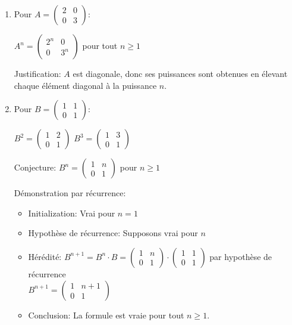 \documentclass[10pt,a4paper]{article}
\begin{document}
\begin{enumerate}
    \item Pour $A = \begin{pmatrix} 2 & 0 \\ 0 & 3 \end{pmatrix}$:

    $A^n = \begin{pmatrix} 2^n & 0 \\ 0 & 3^n \end{pmatrix}$ pour tout $n \geq 1$

    Justification: $A$ est diagonale, donc ses puissances sont obtenues en élevant chaque élément diagonal à la puissance $n$.

    \item Pour $B = \begin{pmatrix} 1 & 1 \\ 0 & 1 \end{pmatrix}$:

    $B^2 = \begin{pmatrix} 1 & 2 \\ 0 & 1 \end{pmatrix}$
    $B^3 = \begin{pmatrix} 1 & 3 \\ 0 & 1 \end{pmatrix}$

    Conjecture: $B^n = \begin{pmatrix} 1 & n \\ 0 & 1 \end{pmatrix}$ pour $n \geq 1$

    Démonstration par récurrence:
    \begin{itemize}
        \item Initialization: Vrai pour $n=1$
        \item Hypothèse de récurrence: Supposons vrai pour $n$
        \item Hérédité: $B^{n+1} = B^n \cdot B = \begin{pmatrix} 1 & n \\ 0 & 1 \end{pmatrix} \cdot
        \begin{pmatrix} 1 & 1 \\ 0 & 1 \end{pmatrix}$ par hypothèse de récurrence\\
        $B^{n+1} = \begin{pmatrix} 1 & n+1 \\ 0 & 1 \end{pmatrix}$
        \item Conclusion: La formule est vraie pour tout $n \geq 1$.
    \end{itemize}


\end{enumerate}
\end{document}
